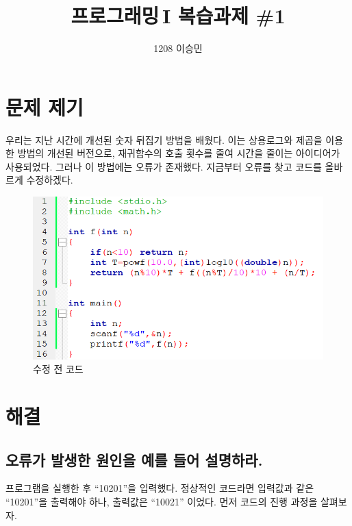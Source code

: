 \documentclass{oblivoir}
\title{프로그래밍\,I 복습과제 \#1}
\author{1208 이승민}
\begin{document}
\maketitle
\tableofcontents

\section{문제 제기}
\hspace{10pt} 우리는 지난 시간에 개선된 숫자 뒤집기 방법을 배웠다. 이는 상용로그와 제곱을 이용한 방법의 개선된 버전으로, 재귀함수의 호출 횟수를 줄여 시간을 줄이는 아이디어가 사용되었다. 그러나 이 방법에는 오류가 존재했다. 지금부터 오류를 찾고 코드를 올바르게 수정하겠다.
\\

\begin{figure}[ht]
\centering
\includegraphics[scale=0.7]{before.png}
\caption{수정 전 코드}
\end{figure}

\section{해결}

\subsection{오류가 발생한 원인을 예를 들어 설명하라.}
\hspace{10pt} 프로그램을 실행한 후 ``10201''을 입력했다. 정상적인 코드라면 입력값과 같은 ``{\color{Green}10201}''을 출력해야 하나, 출력값은 ``{\color{Red}10021}'' 이었다. 먼저 코드의 진행 과정을 살펴보자.	
\end{document}
